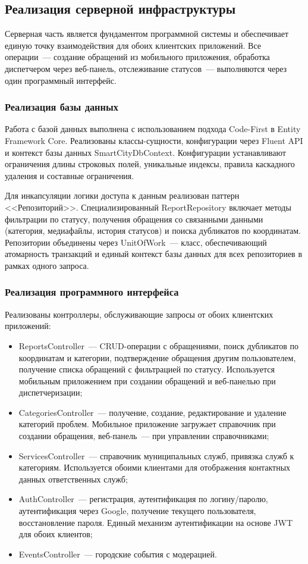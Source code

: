 \subsection{Реализация серверной инфраструктуры}

Серверная часть является фундаментом программной системы и обеспечивает единую точку взаимодействия для обоих клиентских приложений. Все операции~--- создание обращений из мобильного приложения, обработка диспетчером через веб-панель, отслеживание статусов~--- выполняются через один программный интерфейс.

\subsubsection{Реализация базы данных}

Работа с базой данных выполнена с использованием подхода Code-First в Entity Framework Core. Реализованы классы-сущности, конфигурации через Fluent API и контекст базы данных SmartCityDbContext. Конфигурации устанавливают ограничения длины строковых полей, уникальные индексы, правила каскадного удаления и составные ограничения.

Для инкапсуляции логики доступа к данным реализован паттерн <<Репозиторий>>. Специализированный ReportRepository включает методы фильтрации по статусу, получения обращения со связанными данными (категория, медиафайлы, история статусов) и поиска дубликатов по координатам. Репозитории объединены через UnitOfWork~--- класс, обеспечивающий атомарность транзакций и единый контекст базы данных для всех репозиториев в рамках одного запроса.

\subsubsection{Реализация программного интерфейса}

Реализованы контроллеры, обслуживающие запросы от обоих клиентских приложений:
\begin{itemize}
    \item ReportsController~--- CRUD-операции с обращениями, поиск дубликатов по координатам и категории, подтверждение обращения другим пользователем, получение списка обращений с фильтрацией по статусу. Используется мобильным приложением при создании обращений и веб-панелью при диспетчеризации;
    \item CategoriesController~--- получение, создание, редактирование и удаление категорий проблем. Мобильное приложение загружает справочник при создании обращения, веб-панель~--- при управлении справочниками;
    \item ServicesController~--- справочник муниципальных служб, привязка служб к категориям. Используется обоими клиентами для отображения контактных данных ответственных служб;
    \item AuthController~--- регистрация, аутентификация по логину/паролю, аутентификация через Google, получение текущего пользователя, восстановление пароля. Единый механизм аутентификации на основе JWT для обоих клиентов;
    \item EventsController~--- городские события с модерацией.
\end{itemize}

